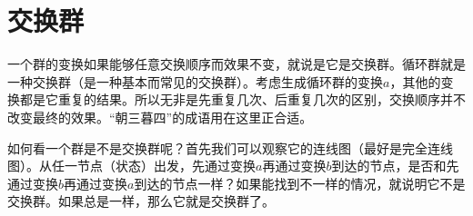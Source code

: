 \documentclass[12pt,UTF8,fontset=none]{ctexbook}
\begin{document}
\section{交换群}

一个群的变换如果能够任意交换顺序而效果不变，就说是它是交换群。循环群就是一种交换群（是一种基本而常见的交换群）。考虑生成循环群的变换$a$，其他的变换都是它重复的结果。所以无非是先重复几次、后重复几次的区别，交换顺序并不改变最终的效果。“朝三暮四”的成语用在这里正合适。

如何看一个群是不是交换群呢？首先我们可以观察它的连线图（最好是完全连线图）。从任一节点（状态）出发，先通过变换$a$再通过变换$b$到达的节点，是否和先通过变换$b$再通过变换$a$到达的节点一样？如果能找到不一样的情况，就说明它不是交换群。如果总是一样，那么它就是交换群了。

\vspace{12pt}
\end{document}
